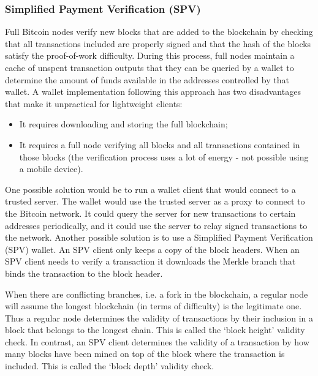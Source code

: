 \documentclass{article}
\begin{document}
\subsubsection*{Simplified Payment Verification (SPV)}
Full Bitcoin nodes verify new blocks that are added to the blockchain by checking that all transactions included are properly signed and that the hash of the blocks satisfy the proof-of-work difficulty. During this process, full nodes maintain a cache of unspent transaction outputs that they can be queried by a wallet to determine the amount of funds available in the addresses controlled by that wallet. A wallet implementation following this approach has two disadvantages that make it unpractical for lightweight clients:
\begin{itemize}
    \item It requires downloading and storing the full blockchain;
    \item It requires a full node verifying all blocks and all transactions contained in those blocks (the verification process uses a lot of energy - not possible using a mobile device).
\end{itemize}
One possible solution would be to run a wallet client that would connect to a trusted server. The wallet would use the trusted server as a proxy to connect to the Bitcoin network. It could query the server for new transactions to certain addresses periodically, and it could use the server to relay signed transactions to the network.\newline
Another possible solution is to use a Simplified Payment Verification (SPV) wallet. An SPV client only keeps a copy of the block headers. When an SPV client needs to verify a transaction it downloads the Merkle branch that binds the transaction to the block header.\par\noindent
When there are conflicting branches, i.e. a fork in the blockchain, a regular node will assume the longest blockchain (in terms of difficulty) is the legitimate one. Thus a regular node determines the validity of transactions by their inclusion in a block that belongs to the longest chain. This is called the ‘block height’ validity check. In contrast, an SPV client determines the validity of a transaction by how many blocks have been mined on top of the block where the transaction is included. This is called the ‘block depth’ validity check.
\end{document}
